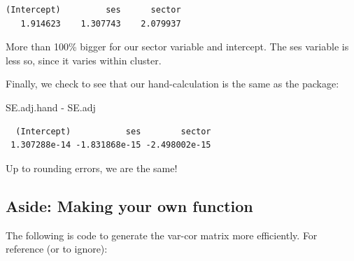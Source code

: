 \documentclass[
  letterpaper,
  DIV=11,
  numbers=noendperiod]{scrreprt}
\newenvironment{Shaded}{\begin{snugshade}}{\end{snugshade}}
\newcommand{\AttributeTok}[1]{\textcolor[rgb]{0.49,0.56,0.16}{#1}}
\newcommand{\ControlFlowTok}[1]{\textcolor[rgb]{0.00,0.44,0.13}{\textbf{#1}}}
\newcommand{\DecValTok}[1]{\textcolor[rgb]{0.25,0.63,0.44}{#1}}
\newcommand{\FunctionTok}[1]{\textcolor[rgb]{0.02,0.16,0.49}{#1}}
\newcommand{\NormalTok}[1]{\textcolor[rgb]{0.00,0.44,0.13}{#1}}
\newcommand{\OtherTok}[1]{\textcolor[rgb]{0.00,0.44,0.13}{#1}}
\newcommand{\SpecialCharTok}[1]{\textcolor[rgb]{0.25,0.44,0.63}{#1}}
\begin{document}
\begin{verbatim}
(Intercept)         ses      sector 
   1.914623    1.307743    2.079937 
\end{verbatim}

More than 100\% bigger for our sector variable and intercept. The ses
variable is less so, since it varies within cluster.

Finally, we check to see that our hand-calculation is the same as the
package:

\begin{Shaded}
\begin{Highlighting}[]
\NormalTok{SE.adj.hand }\SpecialCharTok{{-}}\NormalTok{ SE.adj}
\end{Highlighting}
\end{Shaded}

\begin{verbatim}
  (Intercept)           ses        sector 
 1.307288e-14 -1.831868e-15 -2.498002e-15 
\end{verbatim}

Up to rounding errors, we are the same!

\hypertarget{aside-making-your-own-function}{%
\subsection{Aside: Making your own
function}\label{aside-making-your-own-function}}

The following is code to generate the var-cor matrix more efficiently.
For reference (or to ignore):

\begin{Shaded}
\end{Shaded}
\end{document}
